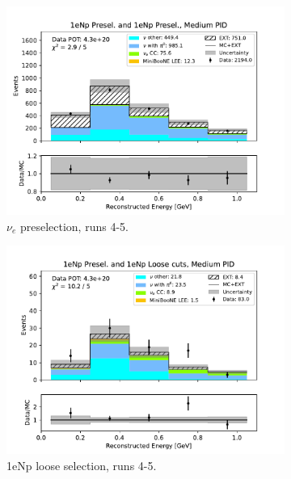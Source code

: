\begin{figure}[H]
\begin{subfigure}{0.5\linewidth}
        \includegraphics[width=\linewidth]{technote/Sidebands/Figures/NearSideband/near_sideband_reco_e_run4b4c4d5_NP_NP_MEDIUM_PID.pdf}
        \caption{$\nu_e$ preselection, runs 4-5.}
    \end{subfigure}%
    \begin{subfigure}{0.5\linewidth}
        \includegraphics[width=\linewidth]{technote/Sidebands/Figures/NearSideband/near_sideband_reco_e_run4b4c4d5_NP_NPL_MEDIUM_PID.pdf}
        \caption{1eNp loose selection, runs 4-5.}
    \end{subfigure}    
    \begin{subfigure}{0.5\linewidth}

\end{subfigure}
\end{figure}
